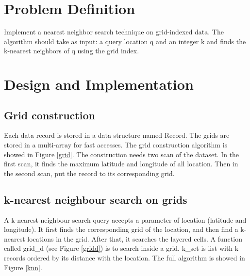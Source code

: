 \documentclass{article}
\def\v#1{{\fontfamily{cmtt}\selectfont #1}}
\begin{document}
\section{Problem Definition}
Implement a nearest neighbor search technique on grid-indexed data.
The algorithm should take as input: a query location q and an integer k and
finds the k-nearest neighbors of q using the grid index.

\section{Design and Implementation}
\subsection{Grid construction}
Each data record is stored in a data structure named \v{Record}. The grids
are stored in a multi-array for fast accesses. The grid construction algorithm
is showed in Figure \ref{grid}. The construction needs two scan of the dataset.
In the first scan, it finds the maximum latitude and longitude of all location.
Then in the second scan, put the record to its corresponding grid.

\subsection{k-nearest neighbour search on grids}
A k-nearest neighbour search query accepts a parameter of
location (latitude and longitude). It first finds the corresponding
grid of the location, and then find a k-nearest locations in the grid.
After that, it searches the layered cells. A function called
\v{grid\_d} (see Figure \ref{gridd}) is to search inside a grid. \v{k\_set} is list with k
records ordered by its distance with the location. The full algorithm is showed in
Figure \ref{knn}.

\end{document}
